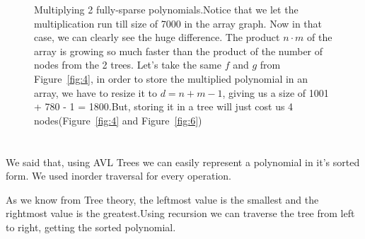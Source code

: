\documentclass[journal,article,submit,moreauthors,algorithms]{Definitions/mdpi}
\begin{document}
\begin{figure}[H] 
\centering
{}
\hfil
{}
\caption{Multiplying 2 fully-sparse polynomials.Notice that we let the multiplication run till size of 7000 in the array graph. Now in that case, we can clearly see the huge difference. The product $n \cdot m$ of the array is growing so much faster than the product of the number of nodes from the 2 trees. Let's take the same $f$ and $g$ from Figure~\ref{fig:4}, in order to store the multiplied polynomial in an array, we have to resize it to $d = n + m - 1$, giving us a size of 1001 + 780 - 1 = 1800.But, storing it in a tree will just cost us 4 nodes(Figure~\ref{fig:4} and Figure~\ref{fig:6})}
\label{fig:14}
\end{figure}

\vspace{6pt} 








\appendixstart
\appendix
\section[\appendixname~\thesection]{}
We said that, using AVL Trees we can easily represent a polynomial in it's sorted form. We used inorder traversal for every operation.

As we know from Tree theory, the leftmost value is the smallest and the rightmost value is the greatest.Using recursion we can traverse the tree from left to right, getting the sorted polynomial.
\end{document}
